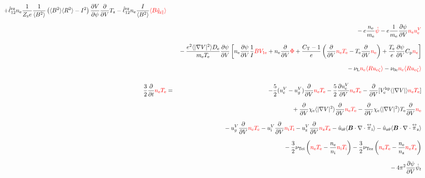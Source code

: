 \documentclass[11pt]{article}
\def\bvec#1{\leavevmode\hbox{\boldmath$#1$}}
\let\vec=\bvec
\def\r#1{{\rm#1}}
\def\aves#1{\langle#1\rangle}
\def\dd#1#2{\frac{\partial #1}{\partial #2}}
\def\tensor#1{\mathord{\displaystyle\mathop{#1}^\leftrightarrow}}
\def\para{\parallel}
\def\ddV{\frac{\partial}{\partial V}}
\def\ddt{\frac{\partial}{\partial t}}
\def\psid{\dot{\psi}}
\def\psit{\psi_t}
\def\psitd{\dot{\psit}}
\def\me{m_\r{e}}
\def\nee{n_\r{e}}
\def\ni{n_\r{i}}
\def\nz{n_\r{z}}
\def\Te{T_\r{e}}
\def\Ti{T_\r{i}}
\def\Tz{T_\r{z}}
\def\Zz{Z_\r{z}}
\def\uzt#1{u_{\r{#1}\zeta}}
\def\upara#1{u_{\r{#1}\para}}
\def\uhatth#1{\hat{u}_{\r{#1}\theta}}
\def\qhatpara#1{\hat{q}_{\r{#1}\para}}
\def\uV#1{u_\r{#1}^V}
\def\ugV{u_{g}^V}
\def\chis#1{\chi_\r{#1}}
\def\De{D_\r{e}}
\def\nun#1{\nu_\r{0#1}}
\def\bri{\aves{B^2}\aves{R^2} - I^2}
\def\nuL{\nu_\r{L}}
\def\red#1{\textcolor{red}{#1}}
\begin{document}
\begin{eqnarray}
  + \hat{\ell}_{12}^\r{ez} \nee \frac{1}{\Zz e} \frac{1}{\aves{B^2}} \left( \bri \right)
    \dd{V}{\psi} \ddV \Tz
  - \hat{\ell}_{12}^\r{ez} \nee \frac{I}{\aves{B^2}} \red{\aves{B \qhatpara{z}}}
\nonumber\\[2.5mm]&&{}
%
  - e \frac{\nee}{\me} \red{\psid}
%
  - e \frac{1}{\me} \dd{\psi}{V} \red{\nee \uV{e}}
%
\nonumber\\[2.5mm]&&{}
%
  - \frac{e^2 \aves{|\nabla V|^2} \De}{\me\Te} \dd{\psi}{V} 
%
  \left[ \nee \dd{\psi}{V} \frac{1}{I} \red{B V_{1\r{e}}}
       + \nee \ddV \red{\Phi}
       + \frac{C_\r{T}-1}{e} \left( \ddV \red{\nee \Te} - \Te \ddV
				    \red{\nee} \right)
       + \frac{\Te}{e} \dd{\psi}{V} C_\r{p} \red{\nee} \right]
\nonumber\\[2.5mm]&&{}
  - \nuL  \red{\nee \aves{R \uzt{e}}}
%
  - \nun{e} \red{\nee \aves{R \uzt{e}}}
\\[5mm]
 \frac{3}{2} \ddt \red{\nee \Te} &=& 
%
  - \frac{5}{2} ( \uV{e} - \ugV ) \ddV \red{\nee \Te}
%
  - \frac{5}{2} \dd{\uV{e}}{V} \red{\nee \Te}
%
  - \ddV [V_\r{e}^\r{hp} \aves{|\nabla V|}   \red{\nee \Te}]
\nonumber\\[2.5mm]&&{}
%
  + \ddV \chis{e} \aves{|\nabla V|^2}\ddV \red{\nee \Te}
  - \ddV \chis{e} \aves{|\nabla V|^2}\Te \ddV \red{\nee}
\nonumber\\[2.5mm]&&{}
%
  - \ugV   \ddV \red{\nee \Te}
  - \uV{i} \ddV \red{\ni  \Ti}
  - \uV{z} \ddV \red{\nz  \Tz}
%
  - \uhatth{i} \aves{\vec{B}\cdot\nabla\cdot\tensor{\pi}_\r{i}}
  - \uhatth{z} \aves{\vec{B}\cdot\nabla\cdot\tensor{\pi}_\r{z}}
\nonumber\\[2.5mm]&&{}
%
  - \frac{3}{2} \nu_\r{Tei} \left(\red{\nee \Te} - \frac{\nee}{\ni} \red{\ni \Ti}\right)
  - \frac{3}{2} \nu_\r{Tez} \left(\red{\nee \Te} - \frac{\nee}{\nz} \red{\nz \Tz}\right)
\nonumber\\[2.5mm]&&{}
%
%
%
  - 4\pi^2 \dd{\psi}{V} \dot{\psi}_t 

\end{eqnarray}
\end{document}
